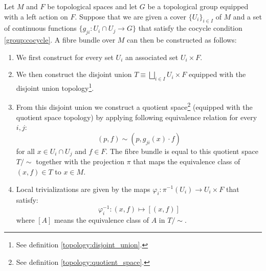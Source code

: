	\begin{construct}\label{manifolds:theorem:fibre_bundle_construction_theorem}
		Let $M$ and $F$ be topological spaces and let $G$ be a topological group equipped with a left action on $F$. Suppose that we are given a cover $\{U_i\}_{i\in I}$ of $M$ and a set of continuous functions $\{g_{ji}:U_i\cap U_j\rightarrow G\}$ that satisfy the cocycle condition \ref{group:cocycle}. A fibre bundle over $M$ can then be constructed as follows:
		\begin{enumerate}
			\item We first construct for every set $U_i$ an associated set $U_i\times F$.
			\item We then construct the disjoint union $T\equiv\bigsqcup_{i\in I}U_i\times F$ equipped with the disjoint union topology\footnote{See definition \ref{topology:disjoint_union}.}.
			\item From this disjoint union we construct a quotient space\footnote{See definition \ref{topology:quotient_space}.} (equipped with the quotient space topology) by applying following equivalence relation for every $i, j$:
				\begin{equation}
					(p, f)\sim(p, g_{ji}(x)\cdot f)
				\end{equation}
				for all $x\in U_i\cap U_j$ and $f\in F$. The fibre bundle is equal to this quotient space $T/\sim$ together with the projection $\pi$ that maps the equivalence class of $(x, f)\in T$ to $x\in M$.
			\item Local trivializations are given by the maps $\varphi_i:\pi^{-1}(U_i)\rightarrow U_i\times F$ that satisfy:
				\begin{equation}
					\varphi_i^{-1}:(x, f)\mapsto [(x, f)]
				\end{equation}
				where $[A]$ means the equivalence class of $A$ in $T/\sim$.
		\end{enumerate}
	\end{construct}
	

